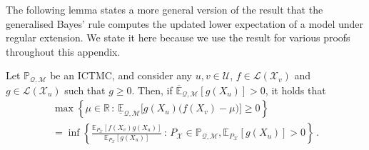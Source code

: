 \documentclass[twoside,11pt]{article}
\newcommand{\reals}{\mathbb{R}}
\newcommand{\states}{\mathcal{X}}
\newcommand{\lexp}{\underline{\mathbb{E}}_{\rateset,\mathcal{M}}}
\newcommand{\uexp}{\overline{\mathbb{E}}_{\rateset,\mathcal{M}}}
\newcommand{\gambles}{\mathcal{L}}
\newcommand{\rateset}{\mathcal{Q}}
\begin{document}
The following lemma states a more general version of the result that the generalised Bayes' rule computes the updated lower expectation of a model under regular extension. We state it here because we use the result for various proofs throughout this appendix.

\begin{lemma}\label{lemma:general_regular_extension}
Let $\mathbb{P}_{\rateset,\mathcal{M}}$ be an ICTMC, and consider any $u,v\in\mathcal{U}$, $f\in\gambles(\states_v)$ and $g\in\gambles(\states_u)$ such that $g\geq 0$. Then, if $\uexp[g(X_u)]>0$, it holds that
\begin{multline*}
 \max\left\{\mu\in\reals\,:\, \lexp\bigl[g(X_u)\bigl(f(X_v) - \mu\bigr)\bigr] \geq 0\right\} \\
 = \inf\left\{ \frac{\mathbb{E}_{P_\states}[f(X_v)g(X_u)]}{\mathbb{E}_{P_\states}[g(X_u)]}\,:\,{P_\states}\in\mathbb{P}_{\rateset,\mathcal{M}}, \mathbb{E}_{P_\states}[g(X_u)]>0 \right\}\,.
\end{multline*}
\end{lemma}
\end{document}
